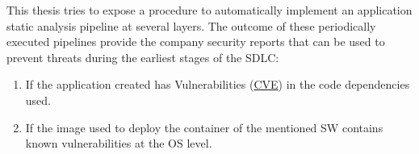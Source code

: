This thesis tries to expose a procedure to automatically implement an application static analysis pipeline at several layers. The outcome of these periodically executed pipelines provide the company security reports that can be used to prevent threats during the earliest stages of the \gls{SDLC}:

\begin{enumerate}
\item If the application created has Vulnerabilities (\href{https://cve.mitre.org/}{\gls{CVE}}) in the code dependencies used.
\item If the image used to deploy the container of the mentioned \gls{SW} contains known vulnerabilities at the \gls{OS} level.
\end{enumerate}

